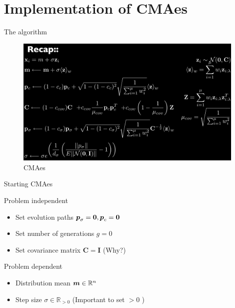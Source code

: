 \documentclass[presentation]{beamer}
\newcommand{\gv}[1]{\ensuremath{\mbox{\boldmath$ #1 $}}}
\newcommand{\bv}[1]{\ensuremath{\mathbf{#1}}}
\begin{document}
\section{Implementation of CMAes}
\label{sec:org0a82582}
\begin{frame}[label={sec:org6b58949}]{The algorithm}
\footnotesize
\begin{figure}[htbp]
\centering
\includegraphics[width=1.03\textwidth]{images/cma_algo.001.jpeg}
\caption{CMAes}
\end{figure}
\end{frame}
\begin{frame}[label={sec:org0982957}]{Starting CMAes}
\begin{block}{Problem independent}
\begin{itemize}
\item Set evolution paths \(\gv{p}_\sigma = \gv{0}, \gv{p}_c = \gv{0}\)
\item Set number of generations \(g = 0\)
\item Set covariance matrix \(\bv{C} = \bv{I}\) (Why?)
\end{itemize}
\end{block}
\begin{block}{Problem dependent}
\begin{itemize}
\item Distribution mean \(\gv{m} \in \mathbb{R}^n\)
\item Step size \(\sigma \in \mathbb{R}_{>0}\) (Important to set \(>0\) )
\end{itemize}
\end{block}
\end{frame}
\end{document}
